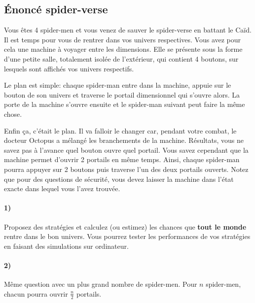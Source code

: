 \documentclass[a4paper,10pt,oneside]{article}
\begin{document}
\newpage
\subsection{Énoncé spider-verse}

Vous êtes 4 spider-men et vous venez de sauver le spider-verse en battant le Caïd.
Il est temps pour vous de rentrer dans vos univers respectives.
Vous avez pour cela une machine à voyager entre les dimensions.
Elle se présente sous la forme d'une petite salle, totalement isolée de l'extérieur, qui contient 4 boutons, sur lesquels sont affichés vos univers respectifs.

Le plan est simple: chaque spider-man entre dans la machine, appuie sur le bouton de son univers et traverse le portail dimensionnel qui s'ouvre alors. 
La porte de la machine s'ouvre ensuite et le spider-man suivant peut faire la même chose.

Enfin ça, c'était le plan. 
Il va falloir le changer car, pendant votre combat, le docteur Octopus a mélangé les branchements de la machine.
Résultats, vous ne savez pas à l'avance quel bouton ouvre quel portail.
Vous savez cependant que la machine permet d'ouvrir 2 portails en même temps.
Ainsi, chaque spider-man pourra appuyer sur 2 boutons puis traverse l'un des deux portails ouverts.
Notez que pour des questions de sécurité, vous devez laisser la machine dans l'état exacte dans lequel vous l'avez trouvée.


\paragraph*{1)}
Proposez des stratégies et calculez (ou estimez) les chances que \textbf{tout le monde} rentre dans le bon univers.
Vous pourrez tester les performances de vos stratégies en faisant des simulations sur ordinateur.

\paragraph*{2)} 
Même question avec un plus grand nombre de spider-men. Pour $n$ spider-men, chacun pourra ouvrir $\frac{n}{2}$ portails.
\end{document}
